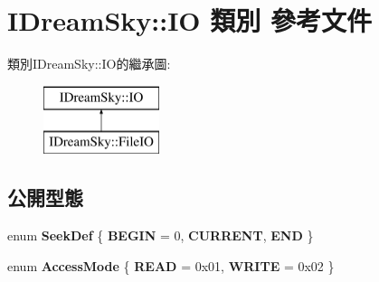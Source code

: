 \hypertarget{class_i_dream_sky_1_1_i_o}{}\section{I\+Dream\+Sky\+:\+:IO 類別 參考文件}
\label{class_i_dream_sky_1_1_i_o}
類別\+I\+Dream\+Sky\+:\+:I\+O的繼承圖\+:\begin{figure}[H]
\begin{center}
\leavevmode
\includegraphics[height=2.000000cm]{class_i_dream_sky_1_1_i_o}
\end{center}
\end{figure}
\subsection*{公開型態}
\begin{DoxyCompactItemize}
\item 
enum {\bfseries Seek\+Def} \{ {\bfseries B\+E\+G\+IN} = 0, 
{\bfseries C\+U\+R\+R\+E\+NT}, 
{\bfseries E\+ND}
 \}\hypertarget{class_i_dream_sky_1_1_i_o_a0e6f707a0a387b12a713071facf306fa}{}\label{class_i_dream_sky_1_1_i_o_a0e6f707a0a387b12a713071facf306fa}

\item 
enum {\bfseries Access\+Mode} \{ {\bfseries R\+E\+AD} = 0x01, 
{\bfseries W\+R\+I\+TE} = 0x02
 \}\hypertarget{class_i_dream_sky_1_1_i_o_a2cc6b28b4454ad1045f58cf116278510}{}\label{class_i_dream_sky_1_1_i_o_a2cc6b28b4454ad1045f58cf116278510}

\end{DoxyCompactItemize}
